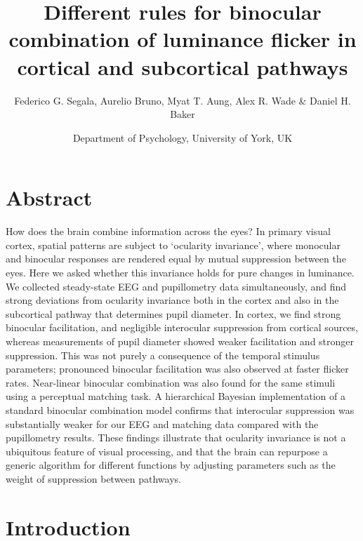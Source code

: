 \documentclass[
]{article}
\title{Different rules for binocular combination of luminance flicker in cortical and subcortical pathways}
\author{Federico G. Segala, Aurelio Bruno, Myat T. Aung, Alex R. Wade \& Daniel H. Baker}
\date{Department of Psychology, University of York, UK}
\begin{document}
\maketitle

\hypertarget{abstract}{%
\section{Abstract}\label{abstract}}

How does the brain combine information across the eyes? In primary visual cortex, spatial patterns are subject to `ocularity invariance', where monocular and binocular responses are rendered equal by mutual suppression between the eyes. Here we asked whether this invariance holds for pure changes in luminance. We collected steady-state EEG and pupillometry data simultaneously, and find strong deviations from ocularity invariance both in the cortex and also in the subcortical pathway that determines pupil diameter. In cortex, we find strong binocular facilitation, and negligible interocular suppression from cortical sources, whereas measurements of pupil diameter showed weaker facilitation and stronger suppression. This was not purely a consequence of the temporal stimulus parameters; pronounced binocular facilitation was also observed at faster flicker rates. Near-linear binocular combination was also found for the same stimuli using a perceptual matching task. A hierarchical Bayesian implementation of a standard binocular combination model confirms that interocular suppression was substantially weaker for our EEG and matching data compared with the pupillometry results. These findings illustrate that ocularity invariance is not a ubiquitous feature of visual processing, and that the brain can repurpose a generic algorithm for different functions by adjusting parameters such as the weight of suppression between pathways.

\hypertarget{introduction}{%
\section{Introduction}\label{introduction}}
\end{document}
